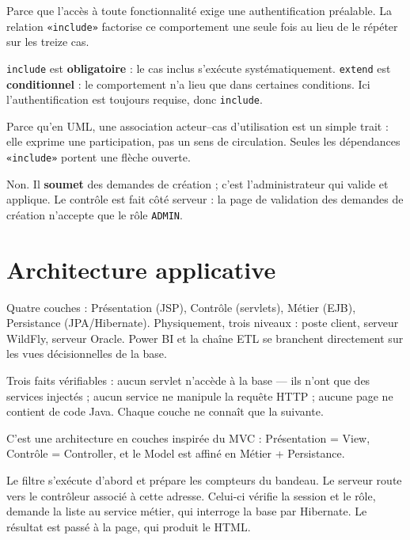 \documentclass[a4paper,11pt]{article}
\begin{document}
Parce que l'accès à toute fonctionnalité exige une authentification préalable.
La relation \texttt{«include»} factorise ce comportement une seule fois au lieu
de le répéter sur les treize cas.

\texttt{include} est \textbf{obligatoire} : le cas inclus s'exécute
systématiquement. \texttt{extend} est \textbf{conditionnel} : le comportement
n'a lieu que dans certaines conditions. Ici l'authentification est toujours
requise, donc \texttt{include}.

Parce qu'en UML, une association acteur--cas d'utilisation est un simple trait :
elle exprime une participation, pas un sens de circulation. Seules les
dépendances \texttt{«include»} portent une flèche ouverte.

Non. Il \textbf{soumet} des demandes de création ; c'est l'administrateur qui
valide et applique. Le contrôle est fait côté serveur : la page de validation
des demandes de création n'accepte que le rôle \texttt{ADMIN}.

\section{Architecture applicative}

Quatre couches : Présentation (JSP), Contrôle (servlets), Métier (EJB),
Persistance (JPA/Hibernate). Physiquement, trois niveaux : poste client, serveur
WildFly, serveur Oracle. Power BI et la chaîne ETL se branchent directement sur
les vues décisionnelles de la base.

Trois faits vérifiables : aucun servlet n'accède à la base --- ils n'ont que des
services injectés ; aucun service ne manipule la requête HTTP ; aucune page ne
contient de code Java. Chaque couche ne connaît que la suivante.

C'est une architecture en couches inspirée du MVC : Présentation = View,
Contrôle = Controller, et le Model est affiné en Métier + Persistance.

Le filtre s'exécute d'abord et prépare les compteurs du bandeau. Le serveur
route vers le contrôleur associé à cette adresse. Celui-ci vérifie la session et
le rôle, demande la liste au service métier, qui interroge la base par
Hibernate. Le résultat est passé à la page, qui produit le HTML.
\end{document}
